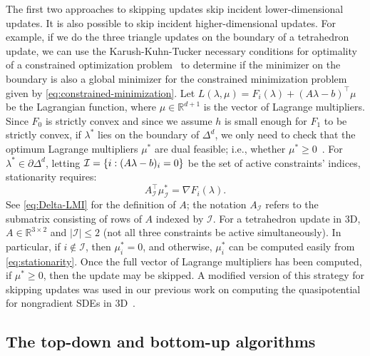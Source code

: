 \documentclass[eikonal.tex]{subfiles}
\begin{document}
The first two approaches to skipping updates skip incident
lower-dimensional updates. It is also possible to skip incident
higher-dimensional updates. For example, if we do the three triangle
updates on the boundary of a tetrahedron update, we can use the
Karush-Kuhn-Tucker necessary conditions for optimality of a
constrained optimization problem~\cite{nocedal2006numerical} to
determine if the minimizer on the boundary is also a global minimizer
for the constrained minimization problem given by
\cref{eq:constrained-minimization}. Let
$L(\lambda, \mu) = F_i(\lambda) + (A\lambda - b)^\top \mu$ be the
Lagrangian function, where $\mu \in \mathbb{R}^{d + 1}$ is the vector
of Lagrange multipliers. Since $F_0$ is strictly convex and since we
assume $h$ is small enough for $F_1$ to be strictly convex, if
$\lambda^*$ lies on the boundary of $\Delta^d$, we only need to check
that the optimum Lagrange multipliers $\mu^*$ are dual feasible; i.e.,
whether
$\mu^* \geq 0$~\cite{bertsekas1999nonlinear,nocedal2006numerical}. For
$\lambda^* \in \partial \Delta^d$, letting
$\mathcal{I} = \left\{i : (A\lambda - b)_i = 0\right\}$ be the set of active
constraints' indices, stationarity requires:
\begin{equation}\label{eq:stationarity}
  A^\top_{\mathcal{I}} \mu_{\mathcal{I}}^* = \nabla F_i(\lambda).
\end{equation}
See \cref{eq:Delta-LMI} for the definition of $A$; the notation
$A_{\mathcal{I}}$ refers to the submatrix consisting of rows of $A$
indexed by $\mathcal{I}$. For a tetrahedron update in 3D,
$A \in \mathbb{R}^{3 \times 2}$ and $|\mathcal{I}| \leq 2$ (not all
three constraints be active simultaneously). In particular, if
$i \notin \mathcal{I}$, then $\mu_i^* = 0$, and otherwise, $\mu_i^*$
can be computed easily from \cref{eq:stationarity}. Once the full
vector of Lagrange multipliers has been computed, if $\mu^* \geq 0$,
then the update may be skipped. A modified version of this strategy
for skipping updates was used in our previous work on computing the
quasipotential for nongradient SDEs in 3D~\cite{yang2019computing}.

\subsection{The top-down and bottom-up algorithms}
\end{document}
